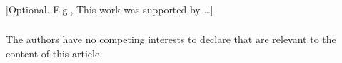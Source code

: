 \documentclass[runningheads]{llncs}
\begin{document}
\begin{credits}
\subsubsection{\ackname} [Optional. E.g., This work was supported by \dots]

\subsubsection{\discintname}
The authors have no competing interests to declare that are relevant to the
content of this article.
\end{credits}

%
%


\end{document}
